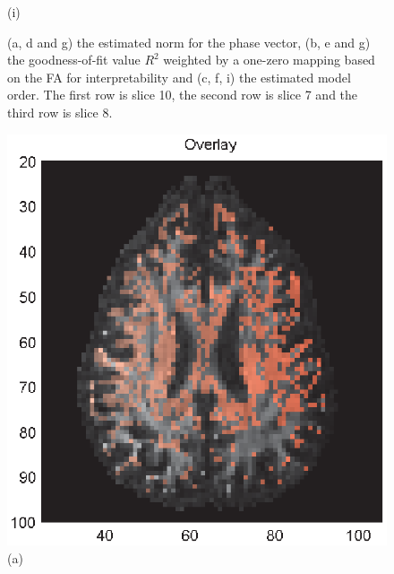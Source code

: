 \documentclass[authoryear,preprint,12pt]{elsarticle}
\begin{document}
\begin{figure}[p]
\begin{center}
\begin{minipage}[]{.30\textwidth}
      (i)
      \end{minipage}
  \end{center}
  \caption{(a, d and g) the estimated norm for the phase vector, (b, e
    and g) the goodness-of-fit value $R^2$ weighted by a one-zero
    mapping based on the FA for interpretability and (c, f, i) the
    estimated model order. The first row is slice 10, the second row
    is slice 7 and the third row is slice 8.}
  \label{fig2} 
\end{figure}

\begin{figure}[tbp]
  \begin{center}
    \begin{minipage}[]{.32\textwidth}
      \centering
      \includegraphics[width=\textwidth]{rejected.eps}
      (a)
    \end{minipage}
    \begin{minipage}[]{.32\textwidth}
      \centering

\end{minipage}
\end{center}
\end{figure}
\end{document}
